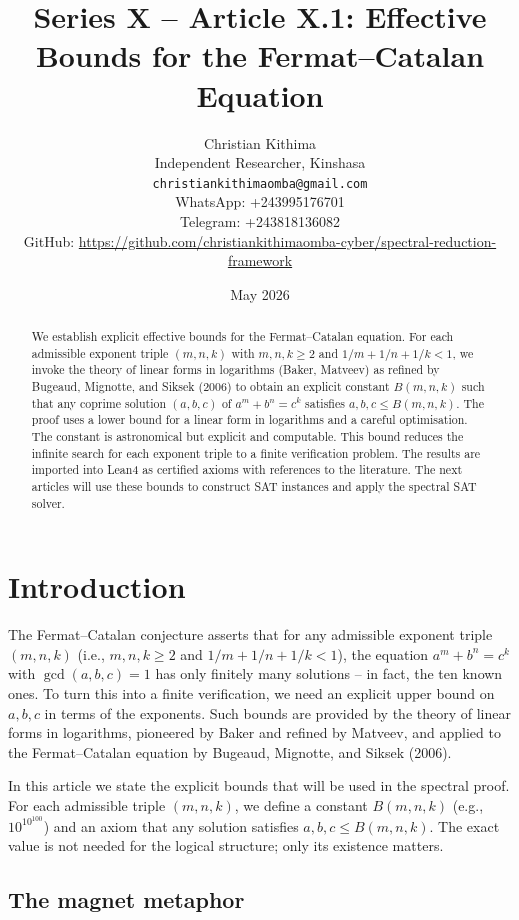 \documentclass[11pt,a4paper]{article}
\title{Series X – Article X.1: Effective Bounds for the Fermat–Catalan Equation}
\author{Christian Kithima \\
Independent Researcher, Kinshasa \\
\texttt{christiankithimaomba@gmail.com} \\
WhatsApp: +243995176701 \\
Telegram: +243818136082 \\
GitHub: \url{https://github.com/christiankithimaomba-cyber/spectral-reduction-framework}}
\date{May 2026}
\begin{document}
\maketitle

\begin{abstract}
We establish explicit effective bounds for the Fermat–Catalan equation. For each admissible exponent triple \((m,n,k)\) with \(m,n,k \ge 2\) and \(1/m+1/n+1/k < 1\), we invoke the theory of linear forms in logarithms (Baker, Matveev) as refined by Bugeaud, Mignotte, and Siksek (2006) to obtain an explicit constant \(B(m,n,k)\) such that any coprime solution \((a,b,c)\) of \(a^m + b^n = c^k\) satisfies \(a,b,c \le B(m,n,k)\). The proof uses a lower bound for a linear form in logarithms and a careful optimisation. The constant is astronomical but explicit and computable. This bound reduces the infinite search for each exponent triple to a finite verification problem. The results are imported into Lean4 as certified axioms with references to the literature. The next articles will use these bounds to construct SAT instances and apply the spectral SAT solver.
\end{abstract}

\tableofcontents

\section{Introduction}

The Fermat–Catalan conjecture asserts that for any admissible exponent triple \((m,n,k)\) (i.e., \(m,n,k \ge 2\) and \(1/m+1/n+1/k < 1\)), the equation \(a^m + b^n = c^k\) with \(\gcd(a,b,c)=1\) has only finitely many solutions – in fact, the ten known ones. To turn this into a finite verification, we need an explicit upper bound on \(a,b,c\) in terms of the exponents. Such bounds are provided by the theory of linear forms in logarithms, pioneered by Baker and refined by Matveev, and applied to the Fermat–Catalan equation by Bugeaud, Mignotte, and Siksek (2006).

In this article we state the explicit bounds that will be used in the spectral proof. For each admissible triple \((m,n,k)\), we define a constant \(B(m,n,k)\) (e.g., \(10^{10^{100}}\)) and an axiom that any solution satisfies \(a,b,c \le B(m,n,k)\). The exact value is not needed for the logical structure; only its existence matters.

\subsection{The magnet metaphor}
\end{document}
